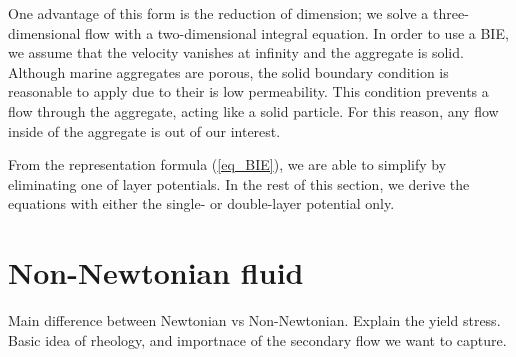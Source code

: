 \par 
One advantage of this form is the reduction of dimension; we solve a three-dimensional flow with a two-dimensional integral equation. 
In order to use a BIE, we assume that the velocity vanishes at infinity and the aggregate is solid. Although marine aggregates are porous, the solid boundary condition is reasonable to apply due to their is low permeability. This condition prevents a flow through the aggregate, acting like a solid particle. For this reason, any flow inside of the aggregate is out of our interest.  
\par
From the representation formula (\ref{eq_BIE}), we are able to simplify by eliminating one of layer potentials. 
In the rest of this section, we derive the equations with either the single- or double-layer potential only. 

\section{Non-Newtonian fluid}
Main difference between Newtonian vs Non-Newtonian. Explain the yield stress. Basic idea of rheology, and importnace of the secondary flow we want to capture. 
